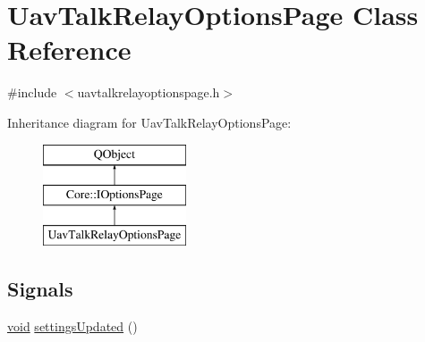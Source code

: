 \hypertarget{class_uav_talk_relay_options_page}{\section{Uav\-Talk\-Relay\-Options\-Page Class Reference}
\label{class_uav_talk_relay_options_page}
}


{\ttfamily \#include $<$uavtalkrelayoptionspage.\-h$>$}

Inheritance diagram for Uav\-Talk\-Relay\-Options\-Page\-:\begin{figure}[H]
\begin{center}
\leavevmode
\includegraphics[height=3.000000cm]{class_uav_talk_relay_options_page}
\end{center}
\end{figure}
\subsection*{Signals}
\begin{DoxyCompactItemize}
\item 
\hyperlink{group___u_a_v_objects_plugin_ga444cf2ff3f0ecbe028adce838d373f5c}{void} \hyperlink{group___u_a_v_talk_gace88a60fb10cfb6c3994f0a3a8883aa3}{settings\-Updated} ()
\end{DoxyCompactItemize}
